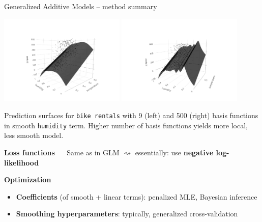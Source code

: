 \documentclass[11pt,compress,t,notes=noshow, xcolor=table]{beamer}
\newcommand{\highlight}[1]{\textcolor{hlcol}{\textbf{#1}}}
\begin{document}
\begin{vbframe}{Generalized Additive Models -- method summary}
\begin{minipage}{0.65\textwidth}
\includegraphics[width=0.45\textwidth, trim=0 0 80 80, clip]{
figure/gam_bike_pred}
\includegraphics[width=0.45\textwidth, trim=80 0 0 80, clip]{
figure/gam_bike_pred_wiggly}
\hfill
\end{minipage}
\begin{minipage}{0.3\textwidth}
\tiny \raggedright
Prediction surfaces for \texttt{bike rentals} with 9 (left) and 500 (right)
basis functions in smooth \texttt{humidity} term.
Higher number of basis functions yields more local, less smooth model.
\end{minipage}

\medskip

\highlight{Loss functions} ~~ Same as in GLM $\rightsquigarrow$ essentially:
use \textbf{negative log-likelihood}

\medskip

\highlight{Optimization}
\begin{itemize}
  \item \textbf{Coefficients} (of smooth + linear terms):
  penalized MLE, Bayesian inference
  \item \textbf{Smoothing hyperparameters}: typically, generalized
  cross-validation
\end{itemize}

\end{vbframe}
\end{document}
